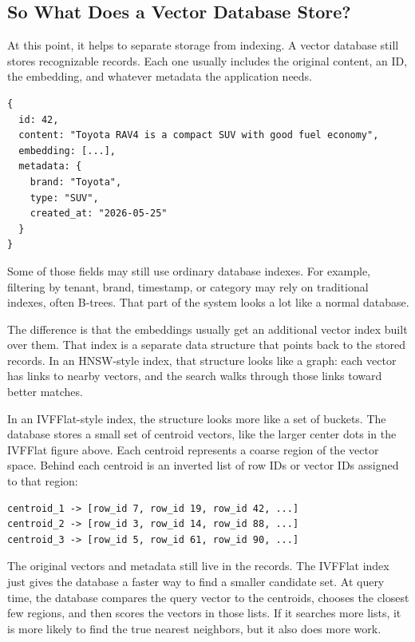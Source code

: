 \documentclass[12pt]{article}
\begin{document}
\subsection{So What Does a Vector Database Store?}

At this point, it helps to separate storage from indexing. A vector
database still stores recognizable records. Each one usually includes the
original content, an ID, the embedding, and whatever metadata the
application needs.

\begin{verbatim}
{
  id: 42,
  content: "Toyota RAV4 is a compact SUV with good fuel economy",
  embedding: [...],
  metadata: {
    brand: "Toyota",
    type: "SUV",
    created_at: "2026-05-25"
  }
}
\end{verbatim}

Some of those fields may still use ordinary database indexes. For
example, filtering by tenant, brand, timestamp, or category may rely on
traditional indexes, often B-trees. That part of the system looks a lot
like a normal database.

The difference is that the embeddings usually get an additional vector
index built over them. That index is a separate data structure that points
back to the stored records. In an HNSW-style index, that structure looks
like a graph: each vector has links to nearby vectors, and the search
walks through those links toward better matches.

In an IVFFlat-style index, the structure looks more like a set of buckets.
The database stores a small set of centroid vectors, like the larger
center dots in the IVFFlat figure above. Each centroid represents a coarse
region of the vector space. Behind each centroid is an inverted list of
row IDs or vector IDs assigned to that region:

\begin{verbatim}
centroid_1 -> [row_id 7, row_id 19, row_id 42, ...]
centroid_2 -> [row_id 3, row_id 14, row_id 88, ...]
centroid_3 -> [row_id 5, row_id 61, row_id 90, ...]
\end{verbatim}

The original vectors and metadata still live in the records. The IVFFlat
index just gives the database a faster way to find a smaller candidate
set. At query time, the database compares the query vector to the
centroids, chooses the closest few regions, and then scores the vectors in
those lists. If it searches more lists, it is more likely to find the true
nearest neighbors, but it also does more work.
\end{document}
